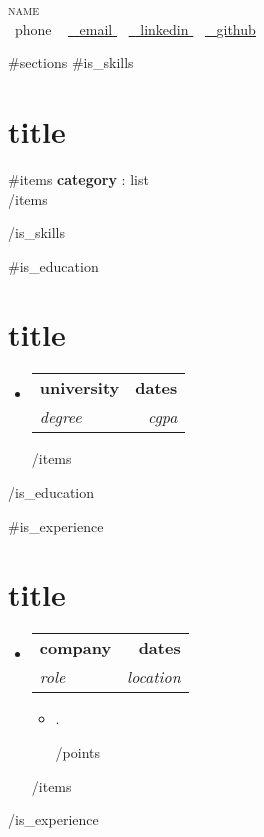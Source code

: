 \documentclass[letterpaper,11pt]{article}
\makeatletter
\newcommand{\resumeItem}[1]{
  \item\small{
    {#1 \vspace{-2pt}}
  }
}
\newcommand{\resumeSubheading}[4]{
  \vspace{-2pt}\item
    \begin{tabular*}{1.0\textwidth}[t]{l@{\extracolsep{\fill}}r}
      \textbf{#1} & \textbf{\small #2} \\
      \textit{\small#3} & \textit{\small #4} \\
    \end{tabular*}\vspace{-7pt}
}
\newcommand{\resumeSubHeadingListStart}{\begin{itemize}[leftmargin=0.0in, label={}]}
\newcommand{\resumeSubHeadingListEnd}{\end{itemize}}
\newcommand{\resumeItemListStart}{\begin{itemize}}
\newcommand{\resumeItemListEnd}{\end{itemize}\vspace{-5pt}}
\makeatother
\begin{document}
\begin{center}
    {\Huge \scshape {{{name}}}} \\ \vspace{1pt}
    \small \raisebox{-0.1\height}\faPhone\ {{{phone}}} ~ \href{mailto:{{{email}}}}{\raisebox{-0.2\height}\faEnvelope\  \underline{ {{{email}}} }}  ~
    \href{https://{{{linkedin}}}}{\raisebox{-0.2\height}\faLinkedin\ \underline{ {{{linkedin}}} }}  ~
    \href{https://{{{github}}}}{\raisebox{-0.2\height}\faGithub\ \underline{ {{{github}}} }}
    \vspace{-8pt}
\end{center}

{{#sections}}
{{#is_skills}}
\section{ {{{title}}} }
 \begin{itemize}[leftmargin=0.15in, label={}]
    \small{\item{
     {{#items}}
     \textbf{ {{{category}}} }{: {{{list}}} } \\
     \vspace{2pt}
     {{/items}}
    }}
 \end{itemize}
 \vspace{-16pt}
{{/is_skills}}

{{#is_education}}
\section{ {{{title}}} }
  \resumeSubHeadingListStart
    {{#items}}
    \resumeSubheading
      { {{{university}}} }{ {{{dates}}} }
      { {{{degree}}} }{ {{{cgpa}}} }
      \vspace{-2pt}
    {{/items}}
  \resumeSubHeadingListEnd
  \vspace{-16pt}
{{/is_education}}

{{#is_experience}}
\section{ {{{title}}} }
  \resumeSubHeadingListStart
    {{#items}}
    \resumeSubheading
      { {{{company}}} }{ {{{dates}}} }
      { {{{role}}} }{ {{{location}}} }
      \resumeItemListStart
        {{#points}}
        \resumeItem{ {{{.}}} }
        {{/points}}
      \resumeItemListEnd
    {{/items}}
  \resumeSubHeadingListEnd
\vspace{-16pt}
{{/is_experience}}
\end{document}
